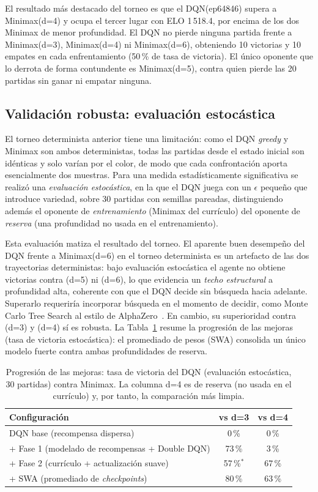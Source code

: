 \documentclass[11pt,a4paper]{article}
\begin{document}
El resultado más destacado del torneo es que el DQN(ep64846) supera a Minimax(d=4) y ocupa el tercer lugar con ELO 1\,518.4, por encima de los dos Minimax de menor profundidad. El DQN no pierde ninguna partida frente a Minimax(d=3), Minimax(d=4) ni Minimax(d=6), obteniendo 10 victorias y 10 empates en cada enfrentamiento (50\,\% de tasa de victoria). El único oponente que lo derrota de forma contundente es Minimax(d=5), contra quien pierde las 20 partidas sin ganar ni empatar ninguna.

\subsection{Validación robusta: evaluación estocástica}

El torneo determinista anterior tiene una limitación: como el DQN \textit{greedy} y Minimax son ambos deterministas, todas las partidas desde el estado inicial son idénticas y solo varían por el color, de modo que cada confrontación aporta esencialmente dos muestras. Para una medida estadísticamente significativa se realizó una \emph{evaluación estocástica}, en la que el DQN juega con un $\epsilon$ pequeño que introduce variedad, sobre 30 partidas con semillas pareadas, distinguiendo además el oponente de \emph{entrenamiento} (Minimax del currículo) del oponente de \emph{reserva} (una profundidad no usada en el entrenamiento).

Esta evaluación matiza el resultado del torneo. El aparente buen desempeño del DQN frente a Minimax(d=6) en el torneo determinista es un artefacto de las dos trayectorias deterministas: bajo evaluación estocástica el agente no obtiene victorias contra (d=5) ni (d=6), lo que evidencia un \emph{techo estructural} a profundidad alta, coherente con que el DQN decide sin búsqueda hacia adelante. Superarlo requeriría incorporar búsqueda en el momento de decidir, como Monte Carlo Tree Search al estilo de AlphaZero~\cite{silver2018}. En cambio, su superioridad contra (d=3) y (d=4) sí es robusta. La Tabla~\ref{tab:progresion} resume la progresión de las mejoras (tasa de victoria estocástica): el promediado de pesos (SWA) consolida un único modelo fuerte contra ambas profundidades de reserva.

\begin{table}[H]
\centering
\caption{Progresión de las mejoras: tasa de victoria del DQN (evaluación estocástica, 30 partidas) contra Minimax. La columna d=4 es de reserva (no usada en el currículo) y, por tanto, la comparación más limpia.}
\begin{tabular}{lcc}
\toprule
Configuración & vs d=3 & vs d=4 \\
\midrule
DQN base (recompensa dispersa)                  & 0\,\%        & 0\,\%  \\
\;\;+ Fase 1 (modelado de recompensas + Double DQN) & 73\,\%   & 3\,\%  \\
\;\;+ Fase 2 (currículo + actualización suave)   & 57\,\%$^{*}$ & 67\,\% \\
\;\;+ SWA (promediado de \textit{checkpoints})   & 80\,\%       & 63\,\% \\
\bottomrule
\end{tabular}
\label{tab:progresion}
\end{table}
\end{document}
